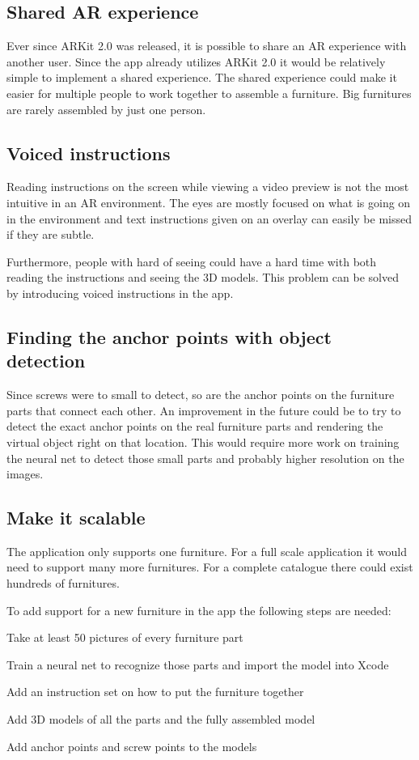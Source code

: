 \subsection{Shared AR experience}
Ever since ARKit 2.0 was released, it is possible to share an AR experience with another user.
Since the app already utilizes ARKit 2.0 it would be relatively simple to implement a shared 
experience. The shared experience could make it easier for multiple people to work together to
assemble a furniture. Big furnitures are rarely assembled by just one person.

\subsection{Voiced instructions}
Reading instructions on the screen while viewing a video preview is not the most intuitive in an
AR environment. The eyes are mostly focused on what is going on in the environment and text
instructions given on an overlay can easily be missed if they are subtle.

Furthermore, people with hard of seeing could have a hard time with both reading the instructions
and seeing the 3D models. This problem can be solved by introducing voiced instructions in the app.

\subsection{Finding the anchor points with object detection}
Since screws were to small to detect, so are the anchor points on the furniture parts that connect
each other.
An improvement in the future could be to try to detect the exact anchor points on the
real furniture parts and rendering the virtual object right on that location. This would
require more work on training the neural net to detect those small parts and probably
higher resolution on the images.

\subsection{Make it scalable}
The application only supports one furniture. For a full scale application it would need to support
many more furnitures. For a complete catalogue there could exist hundreds of furnitures.

To add support for a new furniture in the app the following steps are needed:

\begin{list}{•}
\item Take at least 50 pictures of every furniture part
\item Train a neural net to recognize those parts and import the model into Xcode
\item Add an instruction set on how to put the furniture together
\item Add 3D models of all the parts and the fully assembled model
\item Add anchor points and screw points to the models
\end{list}

